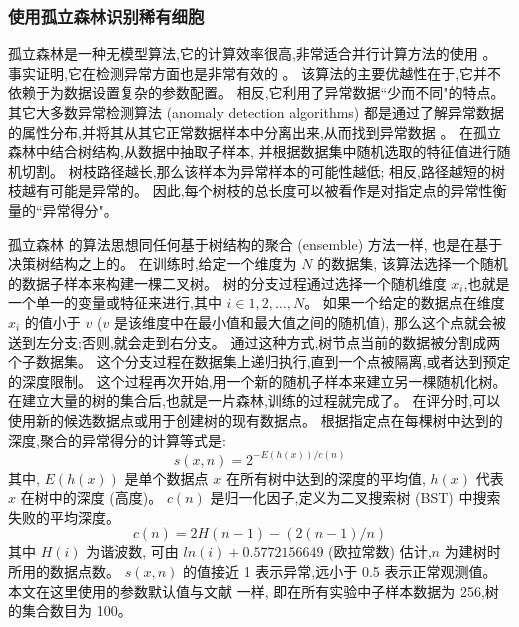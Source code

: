 \subsubsection{使用孤立森林识别稀有细胞}
\label{subsec:if} 

孤立森林是一种无模型算法,它的计算效率很高,非常适合并行计算方法的使用 。
事实证明,它在检测异常方面也是非常有效的 。
该算法的主要优越性在于,它并不依赖于为数据设置复杂的参数配置。
相反,它利用了异常数据``少而不同"的特点。
其它大多数异常检测算法 (anomaly detection algorithms) 都是通过了解异常数据的属性分布,并将其从其它正常数据样本中分离出来,从而找到异常数据 。
在孤立森林中结合树结构,从数据中抽取子样本,
并根据数据集中随机选取的特征值进行随机切割。
树枝路径越长,那么该样本为异常样本的可能性越低;
相反,路径越短的树枝越有可能是异常的。
因此,每个树枝的总长度可以被看作是对指定点的异常性衡量的``异常得分"。

孤立森林  的算法思想同任何基于树结构的聚合 (ensemble) 方法一样,
也是在基于决策树结构之上的。
在训练时,给定一个维度为 $N$ 的数据集,
该算法选择一个随机的数据子样本来构建一棵二叉树。
树的分支过程通过选择一个随机维度 $x_i$,也就是一个单一的变量或特征来进行,其中 $i \in {1,2,\ldots,N}$。
如果一个给定的数据点在维度 $x_i$ 的值小于 $v$ ($v$ 是该维度中在最小值和最大值之间的随机值),
那么这个点就会被送到左分支;否则,就会走到右分支。
通过这种方式,树节点当前的数据被分割成两个子数据集。
这个分支过程在数据集上递归执行,直到一个点被隔离,或者达到预定的深度限制。
这个过程再次开始,用一个新的随机子样本来建立另一棵随机化树。
在建立大量的树的集合后,也就是一片森林,训练的过程就完成了。
在评分时,可以使用新的候选数据点或用于创建树的现有数据点。
根据指定点在每棵树中达到的深度,聚合的异常得分的计算等式是:
\begin{equation}
    \label{as}
    s(x,n) = 2^{-E(h(x))/c(n)}
\end{equation}
其中, $E(h(x))$ 是单个数据点 $x$ 在所有树中达到的深度的平均值, $h(x)$ 代表 $x$ 在树中的深度 (高度)。 
$c(n)$ 是归一化因子,定义为二叉搜索树 (BST) 中搜索失败的平均深度。
\begin{equation}
    \label{lab:as}
    c(n) = 2H(n - 1) - (2(n - 1)/n)
\end{equation}
其中 $H(i)$ 为谐波数,
可由 $ln(i) + 0.5772156649$ (欧拉常数) 估计,$n$ 为建树时所用的数据点数。
$s(x,n)$ 的值接近 1 表示异常,远小于 0.5 表示正常观测值。
本文在这里使用的参数默认值与文献 一样,
即在所有实验中子样本数据为 256,树的集合数目为 100。


